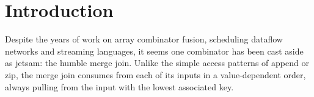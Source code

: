 \section{Introduction}
\label{s:Introduction}

Despite the years of work on array combinator fusion, scheduling dataflow networks and streaming languages, it seems one combinator has been cast aside as jetsam: the humble merge join.
Unlike the simple access patterns of append or zip, the merge join consumes from each of its inputs in a value-dependent order, always pulling from the input with the lowest associated key.






